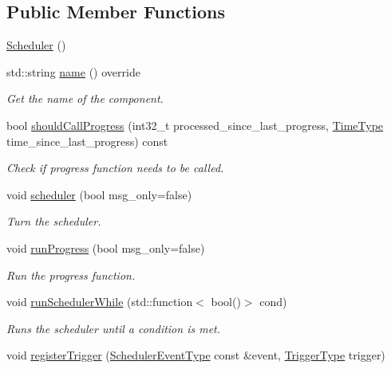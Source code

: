 \subsection*{Public Member Functions}
\begin{DoxyCompactItemize}
\item 
\hyperlink{structvt_1_1sched_1_1_scheduler_a54b61f09996bca1d5ed5332e1a4e2b60}{Scheduler} ()
\item 
std\+::string \hyperlink{structvt_1_1sched_1_1_scheduler_a60d76cb810df35be76d414226c24d6c4}{name} () override
\begin{DoxyCompactList}\small\item\em Get the name of the component. \end{DoxyCompactList}\item 
bool \hyperlink{structvt_1_1sched_1_1_scheduler_aa1e901f6264aa52d918f4c64802e54b5}{should\+Call\+Progress} (int32\+\_\+t processed\+\_\+since\+\_\+last\+\_\+progress, \hyperlink{namespacevt_a876a9d0cd5a952859c72de8a46881442}{Time\+Type} time\+\_\+since\+\_\+last\+\_\+progress) const
\begin{DoxyCompactList}\small\item\em Check if progress function needs to be called. \end{DoxyCompactList}\item 
void \hyperlink{structvt_1_1sched_1_1_scheduler_ad2653b260780c89a20e9253608ef1282}{scheduler} (bool msg\+\_\+only=false)
\begin{DoxyCompactList}\small\item\em Turn the scheduler. \end{DoxyCompactList}\item 
void \hyperlink{structvt_1_1sched_1_1_scheduler_a9c9fc08f6d205761ad162d391aaa7927}{run\+Progress} (bool msg\+\_\+only=false)
\begin{DoxyCompactList}\small\item\em Run the progress function. \end{DoxyCompactList}\item 
void \hyperlink{structvt_1_1sched_1_1_scheduler_a9c130fc0ccbf237633420a7aa35069a4}{run\+Scheduler\+While} (std\+::function$<$ bool()$>$ cond)
\begin{DoxyCompactList}\small\item\em Runs the scheduler until a condition is met. \end{DoxyCompactList}\item 
void \hyperlink{structvt_1_1sched_1_1_scheduler_a818711c413c1ff0e843fffa877c52c78}{register\+Trigger} (\hyperlink{namespacevt_1_1sched_a54756ec39b60951d6765fcfa692d1616}{Scheduler\+Event\+Type} const \&event, \hyperlink{structvt_1_1sched_1_1_scheduler_aa0c06d6e1c31a5f1c3db474036ad7d29}{Trigger\+Type} trigger)

\end{DoxyCompactItemize}

